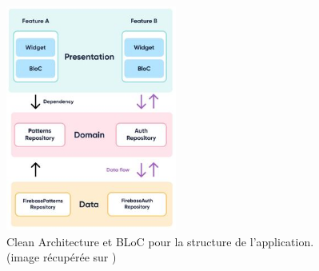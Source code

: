 \begin{figure}[H]
    \centering
    \includegraphics[width=0.5\textwidth]{images/firebase-architecture-BLoC.jpeg}
    \caption{Clean Architecture et BLoC pour la structure de l'application. (image récupérée sur \cite{googleCloudArchitecture})
    }
    \label{fig:architecture}
\end{figure}


